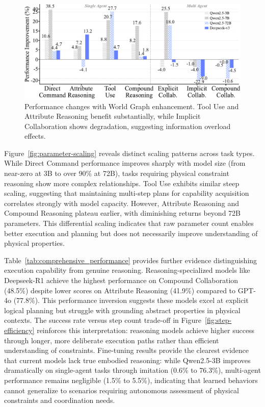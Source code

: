 \begin{figure}[t]
    \centering
    \includegraphics[width=0.75\columnwidth,clip]{figures/ae_1.pdf}
    \caption{Performance changes with World Graph enhancement. Tool Use and Attribute Reasoning benefit substantially, while Implicit Collaboration shows degradation, suggesting information overload effects.}
    \label{fig:global-observation-impact}
\end{figure}
Figure~\ref{fig:parameter-scaling} reveals distinct scaling patterns across task types. While Direct Command performance improves sharply with model size (from near-zero at 3B to over 90\% at 72B), tasks requiring physical constraint reasoning show more complex relationships. Tool Use exhibits similar steep scaling, suggesting that maintaining multi-step plans for capability acquisition correlates strongly with model capacity. However, Attribute Reasoning and Compound Reasoning plateau earlier, with diminishing returns beyond 72B parameters. This differential scaling indicates that raw parameter count enables better execution and planning but does not necessarily improve understanding of physical properties.

Table~\ref{tab:comprehensive_performance} provides further evidence distinguishing execution capability from genuine reasoning. Reasoning-specialized models like Deepseek-R1 achieve the highest performance on Compound Collaboration (48.5\%) despite lower scores on Attribute Reasoning (41.9\%) compared to GPT-4o (77.8\%). This performance inversion suggests these models excel at explicit logical planning but struggle with grounding abstract properties in physical contexts. The success rate versus step count trade-off in Figure~\ref{fig:step-efficiency} reinforces this interpretation: reasoning models achieve higher success through longer, more deliberate execution paths rather than efficient understanding of constraints. Fine-tuning results provide the clearest evidence that current models lack true embodied reasoning: while Qwen2.5-3B improves dramatically on single-agent tasks through imitation (0.6\% to 76.3\%), multi-agent performance remains negligible (1.5\% to 5.5\%), indicating that learned behaviors cannot generalize to scenarios requiring autonomous assessment of physical constraints and coordination needs.



